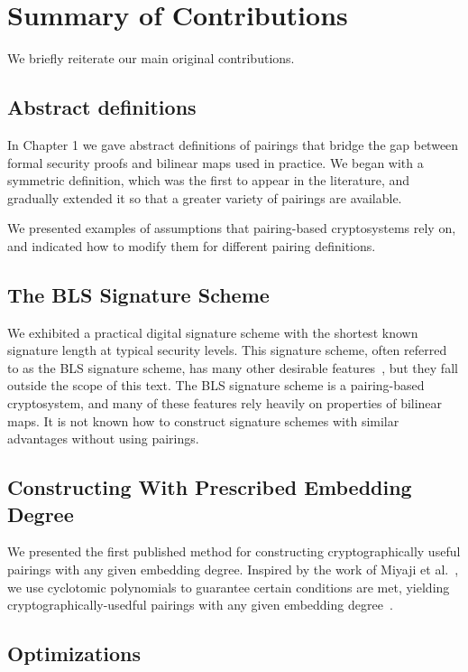\chapter{Summary of Contributions}

We briefly reiterate our main original contributions.

\section{Abstract definitions}

In Chapter 1 we gave abstract definitions of pairings that bridge the
gap between formal security proofs and bilinear maps used in practice.
We began with a symmetric definition, which was the first to appear in
the literature, and gradually extended it so that a greater variety of
pairings are available.

We presented examples of assumptions that pairing-based cryptosystems
rely on, and indicated how to modify them for different pairing definitions.

\section{The BLS Signature Scheme}

We exhibited a practical digital signature scheme with the shortest known
signature length at typical security levels.
This signature scheme, often referred to as the BLS signature scheme,
has many other desirable features~\cite{bls,bgls},
but they fall outside the scope of this text.
The BLS signature scheme is a pairing-based cryptosystem,
and many of these features rely heavily on
properties of bilinear maps. It is not known how to construct
signature schemes with similar advantages without using pairings.

\section{Constructing With Prescribed Embedding Degree}

We presented the
first published method for constructing cryptographically
useful pairings with any given embedding degree.
Inspired by the work of Miyaji et al.~\cite{mnt}, we use
cyclotomic polynomials to guarantee certain conditions are met,
yielding cryptographically-usedful
pairings with any given embedding degree~\cite{bals}.

\section{Optimizations}

